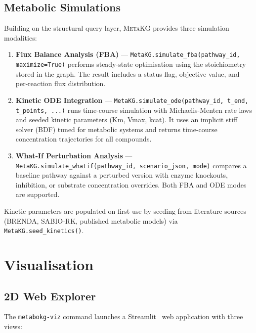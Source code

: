 \documentclass[10pt]{article}
\begin{document}
\subsection{Metabolic Simulations}

Building on the structural query layer, \textsc{MetaKG} provides three
simulation modalities:

\begin{enumerate}[leftmargin=*,itemsep=2pt]
  \item \textbf{Flux Balance Analysis (FBA)} ---
    \texttt{MetaKG.simulate\_fba(pathway\_id, maximize=True)} performs
    steady-state optimisation using the stoichiometry stored in the graph.
    The result includes a status flag, objective value, and per-reaction flux
    distribution.

  \item \textbf{Kinetic ODE Integration} ---
    \texttt{MetaKG.simulate\_ode(pathway\_id, t\_end, t\_points, ...)}
    runs time-course simulation with Michaelis-Menten rate laws and seeded
    kinetic parameters (Km, Vmax, kcat). It uses an implicit stiff solver
    (BDF) tuned for metabolic systems and returns time-course concentration
    trajectories for all compounds.

  \item \textbf{What-If Perturbation Analysis} ---
    \texttt{MetaKG.simulate\_whatif(pathway\_id, scenario\_json, mode)}
    compares a baseline pathway against a perturbed version with enzyme
    knockouts, inhibition, or substrate concentration overrides. Both FBA
    and ODE modes are supported.
\end{enumerate}

Kinetic parameters are populated on first use by seeding from literature
sources (BRENDA, SABIO-RK, published metabolic models) via
\texttt{MetaKG.seed\_kinetics()}.

\section{Visualisation}
\label{sec:viz}

\subsection{2D Web Explorer}

The \texttt{metabokg-viz} command launches a Streamlit~\citep{streamlit2019}
web application with three views:
\end{document}
